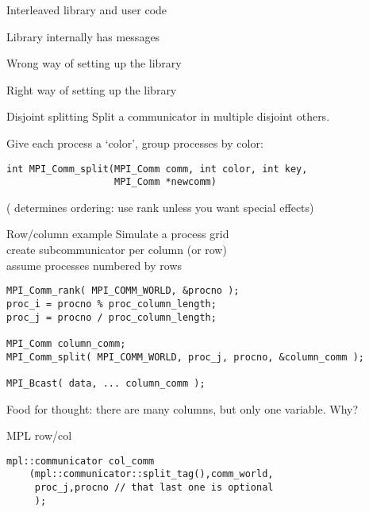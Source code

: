 \begin{numberedframe}{Interleaved library and user code}
\end{numberedframe}
\begin{numberedframe}{Library internally has messages}
\end{numberedframe}
\begin{numberedframe}{Wrong way of setting up the library}
\end{numberedframe}

\begin{numberedframe}{Right way of setting up the library}
\end{numberedframe}

\begin{numberedframe}{Disjoint splitting}
  Split a communicator in multiple disjoint others.
  
Give each process a `color', group processes by color:
\lstset{language=C}
\begin{lstlisting}
int MPI_Comm_split(MPI_Comm comm, int color, int key, 
                   MPI_Comm *newcomm)  
\end{lstlisting}
( determines ordering: use rank unless you want special effects)
\end{numberedframe}


\begin{numberedframe}{Row/column example}
  Simulate a process grid\\
  create subcommunicator per column (or row)\\
  assume processes numbered by rows
\begin{lstlisting}
MPI_Comm_rank( MPI_COMM_WORLD, &procno );
proc_i = procno % proc_column_length;
proc_j = procno / proc_column_length;

MPI_Comm column_comm;
MPI_Comm_split( MPI_COMM_WORLD, proc_j, procno, &column_comm );

MPI_Bcast( data, ... column_comm );
\end{lstlisting}
Food for thought: there are many columns,
but only one  variable. Why?
\end{numberedframe}

\begin{mpl}
\begin{numberedframe}{MPL row/col}
\begin{lstlisting}
mpl::communicator col_comm
    (mpl::communicator::split_tag(),comm_world,
     proc_j,procno // that last one is optional
     );
\end{lstlisting}
\end{numberedframe}
\end{mpl}

